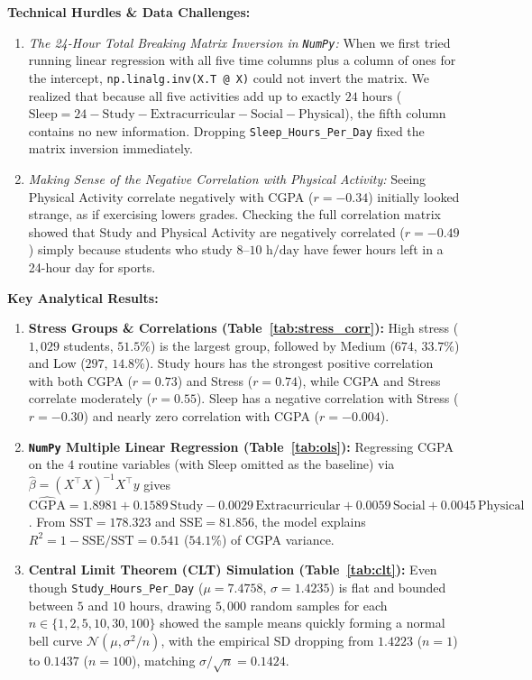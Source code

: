 \documentclass[11pt,a4paper]{article}
\begin{document}
\textbf{Technical Hurdles \& Data Challenges:}
\begin{enumerate}\setlength{\itemsep}{0pt}\setlength{\parskip}{0pt}\setlength{\topsep}{1pt}
    \item \emph{The 24-Hour Total Breaking Matrix Inversion in \texttt{NumPy}:} When we first tried running linear regression with all five time columns plus a column of ones for the intercept, \texttt{np.linalg.inv(X.T @ X)} could not invert the matrix. We realized that because all five activities add up to exactly $24\text{ hours}$ ($\text{Sleep} = 24 - \text{Study} - \text{Extracurricular} - \text{Social} - \text{Physical}$), the fifth column contains no new information. Dropping \texttt{Sleep\_Hours\_Per\_Day} fixed the matrix inversion immediately.
    \item \emph{Making Sense of the Negative Correlation with Physical Activity:} Seeing Physical Activity correlate negatively with CGPA ($r = -0.34$) initially looked strange, as if exercising lowers grades. Checking the full correlation matrix showed that Study and Physical Activity are negatively correlated ($r = -0.49$) simply because students who study $8\text{--}10\text{ h/day}$ have fewer hours left in a 24-hour day for sports.
\end{enumerate}
\newpage

\textbf{\textcolor{accent}{Key Analytical Results:}}
\begin{enumerate}\setlength{\itemsep}{0pt}\setlength{\parskip}{0pt}\setlength{\topsep}{1pt}
    \item \textbf{Stress Groups \& Correlations (Table~\ref{tab:stress_corr}):} High stress ($1,029$ students, $51.5\%$) is the largest group, followed by Medium ($674$, $33.7\%$) and Low ($297$, $14.8\%$). Study hours has the strongest positive correlation with both CGPA ($r = 0.73$) and Stress ($r = 0.74$), while CGPA and Stress correlate moderately ($r = 0.55$). Sleep has a negative correlation with Stress ($r = -0.30$) and nearly zero correlation with CGPA ($r = -0.004$).
    \item \textbf{\texttt{NumPy} Multiple Linear Regression (Table~\ref{tab:ols}):} Regressing CGPA on the $4$ routine variables (with Sleep omitted as the baseline) via $\hat{\beta} = (X^\top X)^{-1} X^\top y$ gives $\widehat{\text{CGPA}} = 1.8981 + 0.1589\,\text{Study} - 0.0029\,\text{Extracurricular} + 0.0059\,\text{Social} + 0.0045\,\text{Physical}$. From $\text{SST} = 178.323$ and $\text{SSE} = 81.856$, the model explains $R^2 = 1 - \text{SSE}/\text{SST} = 0.541$ ($54.1\%$) of CGPA variance.
    \item \textbf{Central Limit Theorem (CLT) Simulation (Table~\ref{tab:clt}):} Even though \texttt{Study\_Hours\_Per\_Day} ($\mu = 7.4758$, $\sigma = 1.4235$) is flat and bounded between $5$ and $10\text{ hours}$, drawing $5,000$ random samples for each $n \in \{1, 2, 5, 10, 30, 100\}$ showed the sample means quickly forming a normal bell curve $\mathcal{N}(\mu, \sigma^2/n)$, with the empirical SD dropping from $1.4223$ ($n=1$) to $0.1437$ ($n=100$), matching $\sigma/\sqrt{n} = 0.1424$.
\end{enumerate}
\end{document}

